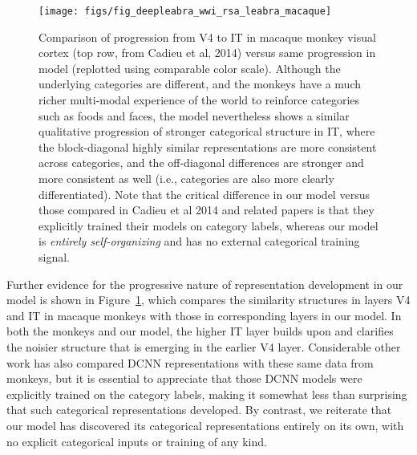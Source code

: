 \documentclass[12pt,twoside]{naturefigs}  %
\newif\myifpdf
\begin{document}
\begin{figure}
  \centering\texttt{[image: figs/fig\_deepleabra\_wwi\_rsa\_leabra\_macaque]}
  \caption{\small \protect{} Comparison of progression from V4 to IT in macaque monkey visual cortex (top row, from Cadieu et al, 2014) versus same progression in model (replotted using comparable color scale).  Although the underlying categories are different, and the monkeys have a much richer multi-modal experience of the world to reinforce categories such as foods and faces, the model nevertheless shows a similar qualitative progression of stronger categorical structure in IT, where the block-diagonal highly similar representations are more consistent across categories, and the off-diagonal differences are stronger and more consistent as well (i.e., categories are also more clearly differentiated).  Note that the critical difference in our model versus those compared in Cadieu et al 2014 and related papers is that they explicitly trained their models on category labels, whereas our model is {\em entirely self-organizing} and has no external categorical training signal.}
  \label{fig.macaque}
\end{figure}


Further evidence for the progressive nature of representation development in our model is shown in Figure~\ref{fig.macaque}, which compares the similarity structures in layers V4 and IT in macaque monkeys\cite{CadieuHongYaminsEtAl14} with those in corresponding layers in our model.  In both the monkeys and our model, the higher IT layer builds upon and clarifies the noisier structure that is emerging in the earlier V4 layer.  Considerable other work has also compared DCNN representations with these same data from monkeys\cite{CadieuHongYaminsEtAl14}, but it is essential to appreciate that those DCNN models were explicitly trained on the category labels, making it somewhat less than surprising that such categorical representations developed.  By contrast, we reiterate that our model has discovered its categorical representations entirely on its own, with no explicit categorical inputs or training of any kind.

\end{document}
